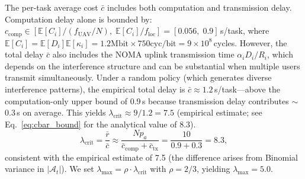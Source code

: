\documentclass[journal]{IEEEtran}
\newcommand{\uav}{\text{UAV}}
\begin{document}
The per-task average cost $\bar{c}$ includes both computation
and transmission delay.
Computation delay alone is bounded by:
$c_{\text{comp}} \in [\mathbb{E}[C_i]/(f_{\uav}/N),\;
\mathbb{E}[C_i]/f_{\text{loc}}] = [0.056,\; 0.9]$\,s/task,
where $\mathbb{E}[C_i] = \mathbb{E}[D_i]\mathbb{E}[\kappa_i]
= 1.2\text{Mbit} \times 750\text{cyc/bit} = 9\times10^8$\,cycles.
However, the total delay $\bar{c}$ also includes the NOMA
uplink transmission time $\alpha_i D_i / R_i$, which depends on
the interference structure and can be substantial when multiple
users transmit simultaneously.
Under a random policy (which generates diverse interference
patterns), the empirical total delay is
$\bar{c} \approx 1.2$\,s/task---above the computation-only
upper bound of 0.9\,s because transmission delay
contributes $\sim$0.3\,s on average.
This yields $\lambda_{\text{crit}} \approx 9/1.2 = 7.5$
(empirical estimate; see Eq.~\eqref{eq:cbar_bound} for the
analytical value of 8.3).
\begin{equation}
  \lambda_{\text{crit}} = \frac{\bar{r}}{\bar{c}} \approx
  \frac{N p_a}{\bar{c}_{\text{comp}} + \bar{c}_{\text{tx}}}
  = \frac{10}{0.9 + 0.3} = 8.3,
  \label{eq:cbar_bound}
\end{equation}
consistent with the empirical estimate of 7.5 (the difference
arises from Binomial variance in $|\mathcal{A}_t|$).
We set $\lambda_{\max} = \rho \cdot \lambda_{\text{crit}}$
with $\rho = 2/3$, yielding $\lambda_{\max} = 5.0$.
\end{document}
